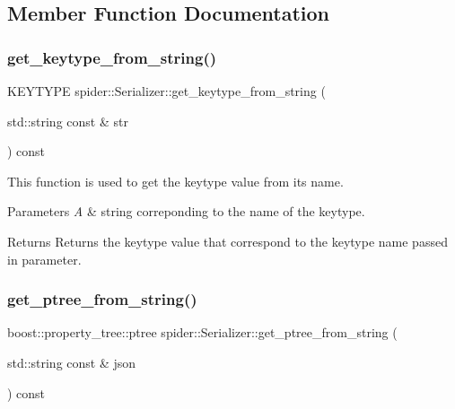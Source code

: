 \subsection{Member Function Documentation}
\mbox{\label{classspider_1_1_serializer_a7cf640d978492cc59889778c108759b0}} 
\subsubsection{\texorpdfstring{get\+\_\+keytype\+\_\+from\+\_\+string()}{get\_keytype\_from\_string()}}
{\footnotesize\ttfamily K\+E\+Y\+T\+Y\+PE spider\+::\+Serializer\+::get\+\_\+keytype\+\_\+from\+\_\+string (\begin{DoxyParamCaption}\item[{std\+::string const \&}]{str }\end{DoxyParamCaption}) const}



This function is used to get the keytype value from its name. 


\begin{DoxyParams}{Parameters}
{\em A} & string correponding to the name of the keytype. \\
\hline
\end{DoxyParams}
\begin{DoxyReturn}{Returns}
Returns the keytype value that correspond to the keytype name passed in parameter. 
\end{DoxyReturn}
\mbox{\label{classspider_1_1_serializer_a8c998904275aa15bb1b114fe8a82be50}} 
\subsubsection{\texorpdfstring{get\+\_\+ptree\+\_\+from\+\_\+string()}{get\_ptree\_from\_string()}}
{\footnotesize\ttfamily boost\+::property\+\_\+tree\+::ptree spider\+::\+Serializer\+::get\+\_\+ptree\+\_\+from\+\_\+string (\begin{DoxyParamCaption}\item[{std\+::string const \&}]{json }\end{DoxyParamCaption}) const}



